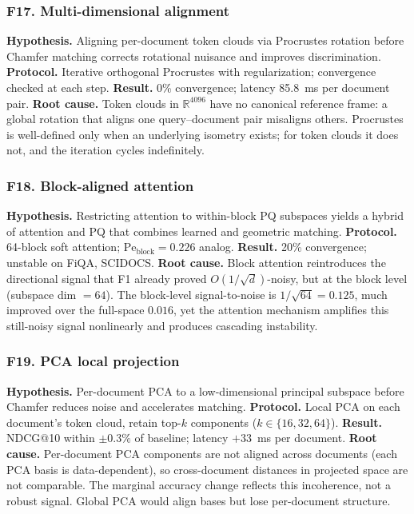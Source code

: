 \documentclass[review,1p,11pt]{elsarticle}
\begin{document}
\subsubsection*{F17. Multi-dimensional alignment}
\textbf{Hypothesis.} Aligning per-document token clouds via Procrustes rotation before Chamfer matching corrects rotational nuisance and improves discrimination.
\textbf{Protocol.} Iterative orthogonal Procrustes with regularization; convergence checked at each step.
\textbf{Result.} 0\% convergence; latency 85.8~ms per document pair.
\textbf{Root cause.} Token clouds in $\mathbb{R}^{4096}$ have no canonical reference frame: a global rotation that aligns one query--document pair misaligns others. Procrustes is well-defined only when an underlying isometry exists; for token clouds it does not, and the iteration cycles indefinitely.

\subsubsection*{F18. Block-aligned attention}
\textbf{Hypothesis.} Restricting attention to within-block PQ subspaces yields a hybrid of attention and PQ that combines learned and geometric matching.
\textbf{Protocol.} 64-block soft attention; $\mathrm{Pe}_{\mathrm{block}} = 0.226$ analog.
\textbf{Result.} 20\% convergence; unstable on FiQA, SCIDOCS.
\textbf{Root cause.} Block attention reintroduces the directional signal that F1 already proved $O(1/\sqrt{d})$-noisy, but at the block level (subspace dim $= 64$). The block-level signal-to-noise is $1/\sqrt{64} = 0.125$, much improved over the full-space $0.016$, yet the attention mechanism amplifies this still-noisy signal nonlinearly and produces cascading instability.

\subsubsection*{F19. PCA local projection}
\textbf{Hypothesis.} Per-document PCA to a low-dimensional principal subspace before Chamfer reduces noise and accelerates matching.
\textbf{Protocol.} Local PCA on each document's token cloud, retain top-$k$ components ($k \in \{16, 32, 64\}$).
\textbf{Result.} NDCG@10 within $\pm 0.3\%$ of baseline; latency $+33$~ms per document.
\textbf{Root cause.} Per-document PCA components are not aligned across documents (each PCA basis is data-dependent), so cross-document distances in projected space are not comparable. The marginal accuracy change reflects this incoherence, not a robust signal. Global PCA would align bases but lose per-document structure.
\end{document}
